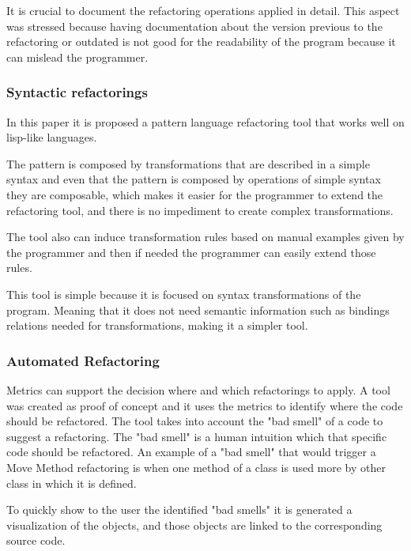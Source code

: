 It is crucial to document the refactoring operations applied in detail. 
This aspect was stressed because having documentation about the version previous to the refactoring or outdated is not good for the readability of the program because it can mislead the programmer.


\subsubsection{Syntactic refactorings}

In this paper \cite{leitdo2002formal} it is proposed a pattern language refactoring tool that works well on lisp-like languages. 

The pattern is composed by transformations that are described in a simple syntax and even that the pattern is composed by operations of simple syntax they are composable, which makes it easier for the programmer to extend the refactoring tool, and there is no impediment to create complex transformations.

The tool also can induce transformation rules based on manual examples given by the programmer and then if needed the programmer can easily extend those rules.

This tool is simple because it is focused on syntax transformations of the program. 
Meaning that it does not need semantic information such as bindings relations needed for transformations, making it a simpler tool.



\subsubsection{Automated Refactoring}
Metrics can support the decision where and which refactorings to apply. \cite{simon2001metrics}
A tool was created as proof of concept and it uses the metrics to identify where the code should be refactored.
The tool takes into account the "bad smell" of a code to suggest a refactoring. The "bad smell" is a human intuition which that specific code should be refactored. 
An example of a "bad smell" that would trigger a Move Method refactoring is when one method of a class is used more by other class in which it is defined.

To quickly show to the user the identified "bad smells" it is generated a visualization of the objects, and those objects are linked to the corresponding source code. 

